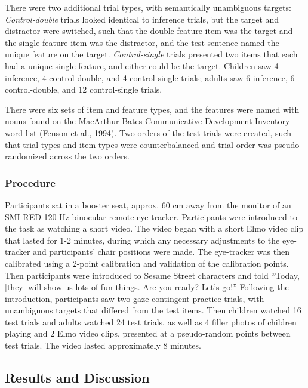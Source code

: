 \documentclass[a4paper,man,apacite,floatsintext]{apa6}
\begin{document}
There were two additional trial types, with semantically unambiguous
targets: \emph{Control-double} trials looked identical to inference
trials, but the target and distractor were switched, such that the
double-feature item was the target and the single-feature item was the
distractor, and the test sentence named the unique feature on the
target. \emph{Control-single} trials presented two items that each had a
unique single feature, and either could be the target. Children saw 4
inference, 4 control-double, and 4 control-single trials; adults saw 6
inference, 6 control-double, and 12 control-single trials.

There were six sets of item and feature types, and the features were
named with nouns found on the MacArthur-Bates Communicative Development
Inventory word list (Fenson et al., 1994). Two orders of the test trials
were created, such that trial types and item types were counterbalanced
and trial order was pseudo-randomized across the two orders.

\subsubsection{Procedure}\label{procedure}

Participants sat in a booster seat, approx. 60 cm away from the monitor
of an SMI RED 120 Hz binocular remote eye-tracker. Participants were
introduced to the task as watching a short video. The video began with a
short Elmo video clip that lasted for 1-2 minutes, during which any
necessary adjustments to the eye-tracker and participants' chair
positions were made. The eye-tracker was then calibrated using a 2-point
calibration and validation of the calibration points. Then participants
were introduced to Sesame Street characters and told ``Today, {[}they{]}
will show us lots of fun things. Are you ready? Let's go!'' Following
the introduction, participants saw two gaze-contingent practice trials,
with unambiguous targets that differed from the test items. Then
children watched 16 test trials and adults watched 24 test trials, as
well as 4 filler photos of children playing and 2 Elmo video clips,
presented at a pseudo-random points between test trials. The video
lasted approximately 8 minutes.

\subsection{Results and Discussion}\label{results-and-discussion}
\end{document}
